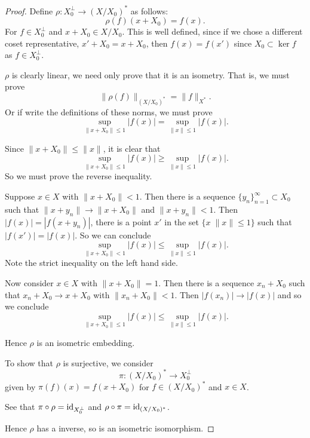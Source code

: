 \documentclass{unswmaths}
\begin{document}
\begin{proof}
    Define $\rho:X_0^\perp \rightarrow (X/X_0)^*$ as follows:
    \begin{equation*}
        \rho(f)(x+X_0) = f(x).
    \end{equation*}
    For $f \in X_0^\perp$ and $x + X_0 \in X/X_0$. This is well defined,
    since if we chose a different coset representative, $x' + X_0 = x+X_0$, then
    $f(x) = f(x')$ since $X_0 \subset \ker f$ as $f \in X_0^\perp$.
    
    $\rho$ is clearly linear, we need only prove that it is an isometry. That is,
    we must prove
    \begin{equation*}
        \| \rho(f) \|_{(X/X_0)^*} = \|f\|_{X^*}.
    \end{equation*}
    Or if write the definitions of these norms, we must prove
    \begin{equation*}
        \sup_{\|x+X_0\|\leq 1} |f(x)| = \sup_{\|x\|\leq 1} |f(x)|.
    \end{equation*}
    
    Since $\|x+X_0\| \leq \|x\|$, it is clear that
    \begin{equation*}
        \sup_{\|x+X_0\|\leq 1} |f(x)| \geq \sup_{\|x\|\leq 1} |f(x)|.
    \end{equation*}
    So we must prove the reverse inequality.
    
    Suppose $x \in X$ with $\|x+X_0\| < 1$. Then there is a sequence $\{y_n\}_{n=1}^\infty \subset X_0$
    such that $\|x+y_n\| \rightarrow \|x+X_0\|$ and $\|x+y_n\| < 1$. Then $|f(x)| = |f(x+y_n)|$,
    there is a point $x'$ in the set $\{ x\; \|x\| \leq 1\}$ such that $|f(x')| = |f(x)|$. 
    So we can conclude
    \begin{equation*}
                \sup_{\|x+X_0\| < 1} |f(x)| \leq \sup_{\|x\|\leq 1} |f(x)|.
    \end{equation*}
    Note the strict inequality on the left hand side.
    
    Now consider $x \in X$ with $\|x+X_0\| = 1$. Then there is a sequence $x_n+X_0$
    such that $x_n + X_0\rightarrow x+X_0$ with $\|x_n+X_0\| < 1$. Then $|f(x_n)| \rightarrow |f(x)|$
    and so we conclude 
    \begin{equation*}
                \sup_{\|x+X_0\| \leq 1} |f(x)| \leq \sup_{\|x\|\leq 1} |f(x)|.
    \end{equation*}
    
    Hence $\rho$ is an isometric embedding.
    
    To show that $\rho$ is surjective, we consider
    \begin{equation*}
        \pi: (X/X_0)^*\rightarrow X_0^\perp
    \end{equation*}
    given by $\pi(f)(x) = f(x+X_0)$ for $f \in (X/X_0)^*$ and $x \in X$.
    
    See that $\pi\circ\rho = {\operatorname{id}}_{X_0^\perp}$ and $\rho\circ\pi = {\operatorname{id}}_{(X/X_0)^*}$. 
    
    Hence $\rho$ has a inverse, so is an isometric isomorphism.    
\end{proof}
\end{document}
